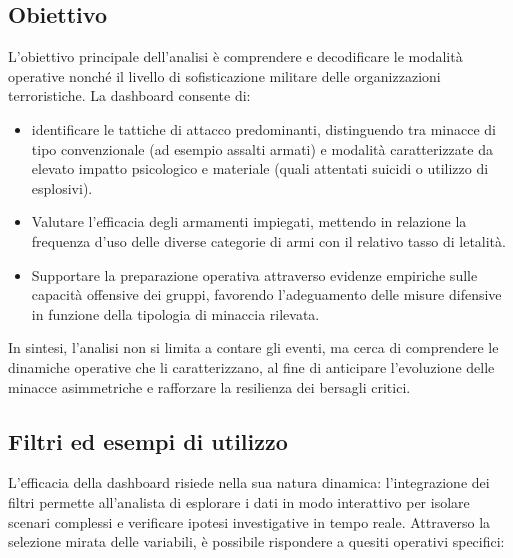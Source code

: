 \subsection{Obiettivo}

L’obiettivo principale dell’analisi è comprendere e decodificare le modalità operative nonché il livello di sofisticazione militare delle organizzazioni terroristiche. La dashboard consente di:

\begin{itemize}
    \item identificare le tattiche di attacco predominanti, distinguendo tra minacce di tipo convenzionale (ad esempio assalti armati) e modalità caratterizzate da elevato impatto psicologico e materiale (quali attentati suicidi o utilizzo di esplosivi).
    
    \item Valutare l’efficacia degli armamenti impiegati, mettendo in relazione la frequenza d’uso delle diverse categorie di armi con il relativo tasso di letalità.
    
    \item Supportare la preparazione operativa attraverso evidenze empiriche sulle capacità offensive dei gruppi, favorendo l’adeguamento delle misure difensive in funzione della tipologia di minaccia rilevata.
\end{itemize}

In sintesi, l’analisi non si limita a contare gli eventi, ma cerca di comprendere le dinamiche operative che li caratterizzano, al fine di anticipare l’evoluzione delle minacce asimmetriche e rafforzare la resilienza dei bersagli critici.

\subsection{Filtri ed esempi di utilizzo}

L'efficacia della dashboard risiede nella sua natura dinamica: l'integrazione dei filtri permette all'analista di esplorare i dati in modo interattivo per isolare scenari complessi e verificare ipotesi investigative in tempo reale. Attraverso la selezione mirata delle variabili, è possibile rispondere a quesiti operativi specifici:

